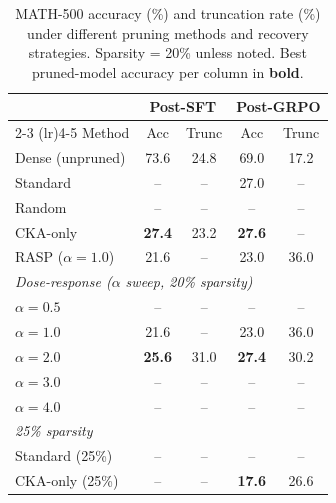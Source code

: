 \begin{table}[t]
\centering
\small
\caption{MATH-500 accuracy (\%) and truncation rate (\%) under different pruning methods and recovery strategies. Sparsity = 20\% unless noted. Best pruned-model accuracy per column in \textbf{bold}.}
\label{tab:math500}
\begin{tabular}{l cc cc}
\toprule
& \multicolumn{2}{c}{\textbf{Post-SFT}} & \multicolumn{2}{c}{\textbf{Post-GRPO}} \\
\cmidrule(lr){2-3} \cmidrule(lr){4-5}
Method & Acc & Trunc & Acc & Trunc \\
\midrule
    Dense (unpruned) & 73.6 & 24.8 & 69.0 & 17.2 \\
\midrule
    Standard & -- & -- & 27.0 & -- \\
    Random & -- & -- & -- & -- \\
    CKA-only & \textbf{27.4} & 23.2 & \textbf{27.6} & -- \\
    RASP ($\alpha\!=\!1.0$) & 21.6 & -- & 23.0 & 36.0 \\
\midrule
\multicolumn{5}{l}{\textit{Dose-response ($\alpha$ sweep, 20\% sparsity)}} \\
    $\alpha = 0.5$ & -- & -- & -- & -- \\
    $\alpha = 1.0$ & 21.6 & -- & 23.0 & 36.0 \\
    $\alpha = 2.0$ & \textbf{25.6} & 31.0 & \textbf{27.4} & 30.2 \\
    $\alpha = 3.0$ & -- & -- & -- & -- \\
    $\alpha = 4.0$ & -- & -- & -- & -- \\
\midrule
\multicolumn{5}{l}{\textit{25\% sparsity}} \\
    Standard (25\%) & -- & -- & -- & -- \\
    CKA-only (25\%) & -- & -- & \textbf{17.6} & 26.6 \\
\bottomrule
\end{tabular}
\end{table}
